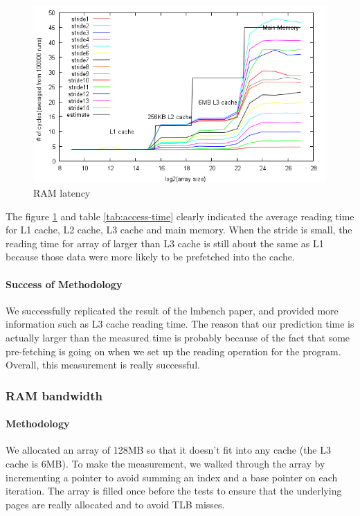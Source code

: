 \begin{figure}[h]
\begin{center}
\includegraphics[scale=0.8]{memoryLatencyImage}
\end{center}
\caption {RAM latency\label{fig:access-time}}

\end{figure}



The figure \ref{fig:access-time} and table \ref{tab:access-time} clearly indicated the average reading time for L1 cache, L2 cache, L3 cache and main memory. When the stride is small, the reading time for array of larger than L3 cache is still about the same as L1 because those data were more likely to be prefetched into the cache.

\paragraph{Success of Methodology}
We successfully replicated the result of the lmbench paper, and provided more information such as L3 cache reading time. The reason that our prediction time is actually larger than the measured time is probably because of the fact that some pre-fetching is going on when we set up the reading operation for the program. Overall, this measurement is really successful.

\subsubsection{RAM bandwidth}
\paragraph{Methodology}
We allocated an array of 128MB so that it doesn't fit into any cache (the L3 cache is 6MB).
To make the measurement, we walked through the array by incrementing a pointer to avoid summing an index and a base pointer on each iteration.
The array is filled once before the tests to ensure that the underlying pages are really allocated and to avoid TLB misses.



